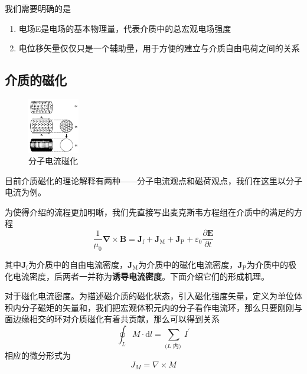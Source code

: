 		我们需要明确的是
		\begin{enumerate}
		\item 电场E是电场的基本物理量，代表介质中的总宏观电场强度
		\item 电位移矢量仅仅只是一个辅助量，用于方便的建立与介质自由电荷之间的关系
		\end{enumerate}

		
	\subsection{介质的磁化}
		\begin{figure}%
	      \centering
	      \includegraphics[width=0.2\textwidth]{figs/分子电流磁化.jpg}
	      \caption{分子电流磁化}
	      \end{figure}
		目前介质磁化的理论解释有两种——分子电流观点和磁荷观点，我们在这里以分子电流为例。

		为使得介绍的流程更加明晰，我们先直接写出麦克斯韦方程组在介质中的满足的方程
		\begin{equation}
		\label{eq.4.16}
			\frac{1}{\mu_{0}} \boldsymbol{\nabla} \times \boldsymbol{B}=\boldsymbol{J}_{\mathrm{f}}+\boldsymbol{J}_{\mathrm{M}}+\boldsymbol{J}_{\mathrm{P}}+\varepsilon_{0} \frac{\partial \boldsymbol{E}}{\partial t}
		\end{equation}

		其中$\boldsymbol{J}_{\mathrm{f}}$为介质中的自由电流密度，$\boldsymbol{J}_{\mathrm{M}}$为介质中的磁化电流密度，$\boldsymbol{J}_{\mathrm{P}}$为介质中的极化电流密度，后两者一并称为\textbf{诱导电流密度}。下面介绍它们的形成机理。

		对于磁化电流密度。为描述磁介质的磁化状态，引入磁化强度矢量，定义为单位体积内分子磁矩的矢量和，我们把宏观体积元内的分子看作电流环，那么只要刚刚与面边缘相交的环对介质磁化有着共贡献，那么可以得到关系
		\begin{equation}
			\oint_{L} M \cdot \mathrm{d} l=\sum_{(L \text { 内) }} I^{\prime}
		\end{equation}
		相应的微分形式为
		\begin{equation}
			J_{M}=\nabla \times M
		\end{equation}

